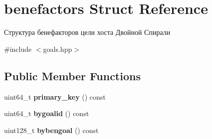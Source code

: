 \hypertarget{structbenefactors}{}\section{benefactors Struct Reference}
\label{structbenefactors}


Структура бенефакторов цели хоста Двойной Спирали  




{\ttfamily \#include $<$goals.\+hpp$>$}

\subsection*{Public Member Functions}
\begin{DoxyCompactItemize}
\item 
\mbox{\label{structbenefactors_ad365cc6b12b704cfc599811ce62e2af6}} 
uint64\+\_\+t {\bfseries primary\+\_\+key} () const
\item 
\mbox{\label{structbenefactors_aea4edf7d9708f8b4ad53249b417ee5fc}} 
uint64\+\_\+t {\bfseries bygoalid} () const
\item 
\mbox{\label{structbenefactors_a9fdd8b8be320de55a7f08424b0e94a6f}} 
uint128\+\_\+t {\bfseries bybengoal} () const
\end{DoxyCompactItemize}
